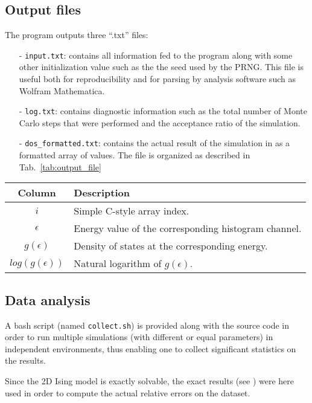 \documentclass[11pt]{article}
\newcommand{\tabname}{Tab.~}
\begin{document}
\subsection{Output files}
The program outputs three ``.txt'' files:
\begin{itemize}
	\item[-] \verb|input.txt|: contains all information fed to the program along with some other initialization value such as the the seed used by the PRNG. This file is useful both for reproducibility and for parsing by analysis software such as Wolfram Mathematica.
	\item[-] \verb|log.txt|: contains diagnostic information such as the total number of Monte Carlo steps that were performed and the acceptance ratio of the simulation.
	\item[-] \verb|dos_formatted.txt|: contains the actual result of the simulation in as a formatted array of values. The file is organized as described in \tabname \ref{tab:output_file}\\
\end{itemize}

\begin{center}
\label{tab:output_file}
\begin{tabular}{cl}
\toprule
	Column				&	Description												\\
\midrule
	$i$					&	Simple C-style array index.								\\
	$\epsilon$			&	Energy value of the corresponding histogram channel.	\\
	$g(\epsilon)$		&	Density of states at the corresponding energy.			\\
	$log(g(\epsilon))$	&	Natural logarithm of $g(\epsilon)$.						\\
\bottomrule
\end{tabular}
\end{center}

\subsection{Data analysis}

A bash script (named \verb|collect.sh|) is provided along with the source code in order to run multiple simulations (with different or equal parameters) in independent environments, thus enabling one to collect significant statistics on the results.

Since the 2D Ising model is exactly solvable, the exact results (see \cite{bib:exact}) were here used in order to compute the actual relative errors on the dataset.
\end{document}
